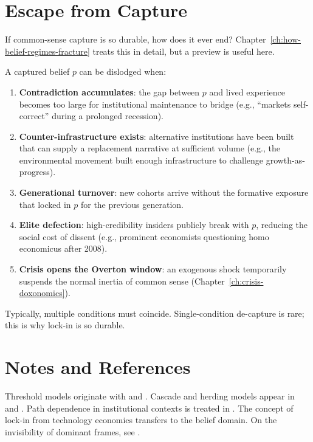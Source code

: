 \section{Escape from Capture}
\label{sec:ch8-escape}

If common-sense capture is so durable, how does it ever end?
Chapter~\ref{ch:how-belief-regimes-fracture} treats this in detail, but a preview is useful here.

\begin{conjecture}
\label{conj:de-capture}
A captured belief $p$ can be dislodged when:
\begin{enumerate}[nosep]
  \item \textbf{Contradiction accumulates}: the gap between $p$ and lived experience becomes too large for institutional maintenance to bridge (e.g., ``markets self-correct'' during a prolonged recession).
  \item \textbf{Counter-infrastructure exists}: alternative institutions have been built that can supply a replacement narrative at sufficient volume (e.g., the environmental movement built enough infrastructure to challenge growth-as-progress).
  \item \textbf{Generational turnover}: new cohorts arrive without the formative exposure that locked in $p$ for the previous generation.
  \item \textbf{Elite defection}: high-credibility insiders publicly break with $p$, reducing the social cost of dissent (e.g., prominent economists questioning homo economicus after 2008).
  \item \textbf{Crisis opens the Overton window}: an exogenous shock temporarily suspends the normal inertia of common sense (Chapter~\ref{ch:crisis-doxonomics}).
\end{enumerate}
Typically, multiple conditions must coincide.
Single-condition de-capture is rare; this is why lock-in is so durable.
\end{conjecture}


\section{Notes and References}
\label{sec:ch8-notes}

Threshold models originate with \textcite{granovetter1978} and \textcite{schelling1978}.
Cascade and herding models appear in \textcite{banerjee1992} and \textcite{bikhchandani1992}.
Path dependence in institutional contexts is treated in \textcite{north1990}.
The concept of lock-in from technology economics \autocite{arthur1989} transfers to the belief domain.
On the invisibility of dominant frames, see \textcite{lukes2005}.

